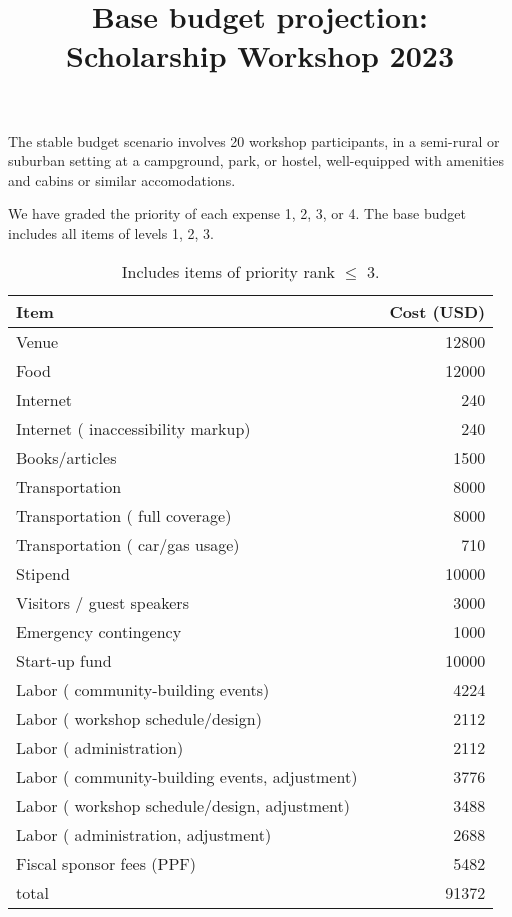 \documentclass[10pt]{article}
\title{Base budget projection: Scholarship Workshop 2023}
\date{}
\begin{document}
\maketitle

\vspace{-1pc}


The stable budget scenario involves 20 workshop participants, in a semi-rural or suburban setting at a campground, park, or hostel, well-equipped with amenities and cabins or similar accomodations.

We have graded the priority of each expense 1, 2, 3, or 4. The base budget includes all items of levels 1, 2, 3.

\begin{table}[h]
\begin{center}
\begin{tabular}{llr}
Item & & Cost (USD) \\ \hline
Venue &  & 12800 \\
Food &  & 12000 \\
Internet &  & 240 \\
Internet ( inaccessibility markup) &  & 240 \\
Books/articles &  & 1500 \\
Transportation &  & 8000 \\
Transportation ( full coverage) &  & 8000 \\
Transportation ( car/gas usage) &  & 710 \\
Stipend &  & 10000 \\
Visitors / guest speakers &  & 3000 \\
Emergency contingency &  & 1000 \\
Start-up fund &  & 10000 \\
Labor ( community-building events) &  & 4224 \\
Labor ( workshop schedule/design) &  & 2112 \\
Labor ( administration) &  & 2112 \\
Labor ( community-building events, adjustment) &  & 3776 \\
Labor ( workshop schedule/design, adjustment) &  & 3488 \\
Labor ( administration, adjustment) &  & 2688 \\
Fiscal sponsor fees (PPF) &  & 5482 \\ \hline
total &  & 91372
\end{tabular}
\end{center}
\caption{Includes items of priority rank $\leq$ 3.}\label{main}
\end{table}
\end{document}
